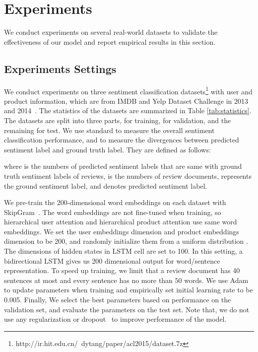 \documentclass[letterpaper]{article} \usepackage{aaai18}  \usepackage{times}  \usepackage{helvet}  \usepackage{courier}  \usepackage{url}  \usepackage{graphicx}  \frenchspacing  \usepackage{amsmath}
\begin{document}
\section{Experiments}
We conduct experiments on several real-world datasets to validate the effectiveness of our model and report empirical results in this section.

\subsection{Experiments Settings}
We conduct experiments on three sentiment classification datasets\footnote{http://ir.hit.edu.cn/~dytang/paper/acl2015/dataset.7z} with user and product information, which are from IMDB and Yelp Dataset Challenge in 2013 and 2014~\cite{tang2015learning}. The statistics of the datasets are summarized in Table \ref{tab:statistics}. The datasets are split into three parts,  for training,  for validation, and the remaining  for test. We use standard  to measure the overall sentiment classification performance, and  to measure the divergences between predicted sentiment label and ground truth label. They are defined as follows:

where  is the numbers of predicted sentiment labels that are same with ground truth sentiment labels of reviews,  is the numbers of review documents,  represents the ground sentiment label, and  denotes predicted sentiment label.

We pre-train the 200-dimensional word embeddings on each dataset with SkipGram~\cite{mikolov2013distributed}. The word embeddings are not fine-tuned when training, so hierarchical user attention and hierarchical product attention use same word embeddings. We set the user embeddings dimension and product embeddings dimension to be 200, and randomly initialize them from a uniform distribution . The dimensions of hidden states in LSTM cell are set to 100. In this setting, a bidirectional LSTM gives us 200 dimensional output for word/sentence representation. To speed up training, we limit that a review document has 40 sentences at most and every sentence has no more than 50 words.
We use Adam~\cite{kingma2014adam} to update parameters when training and empirically set initial learning rate to be 0.005. Finally, We select the best parameters based on performance on the validation set, and evaluate the parameters on the test set. Note that, we do not use any regularization or dropout~\cite{srivastava2014dropout} to improve performance of the model.
\end{document}
